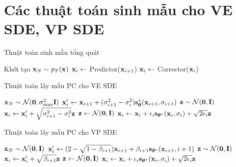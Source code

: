 \documentclass[10pt]{beamer}
\theoremstyle{remark}
\numberwithin{algocf}{section}
\numberwithin{equation}{section}
\numberwithin{dl}{section}
\numberwithin{figure}{section}
\begin{document}
\section{Các thuật toán sinh mẫu cho VE SDE, VP SDE}

\begin{frame}{Thuật toán sinh mẫu tổng quát}
	\begin{algorithm}[H]
		\DontPrintSemicolon
		Khởi tạo $\bold{x}_N \sim p_T(\bold{x})$\;
		 {
			$\bold{x}_i \gets$ Predictor($\bold{x}_{i+1}$)\;
			 {
				$\bold{x}_i \gets$ Corrector($\bold{x}_i$)\;
			}
		}
		\;
		\caption{Bộ lấy mẫu dự đoán - hiệu chỉnh (PC)}
		\label{alg:1}
	\end{algorithm}
\end{frame}

\begin{frame}{Thuật toán lấy mẫu PC cho VE SDE}
	\begin{algorithm}[H]
		\DontPrintSemicolon
		$\bold{x}_N \sim \mathcal{N}(\bold{0}, \sigma_{\max}^2 \bold{I})$\;
		 {
			$\bold{x}_i^{\prime} \gets \bold{x}_{i+1} + (\sigma_{i+1}^2 - \sigma_i^2)\bold{s}_{\boldsymbol{\theta}}^{\ast}(\bold{x}_{i+1}, \sigma_{i+1})$\;
			$\bold{z} \sim \mathcal{N}(\bold{0}, \bold{I})$\;
			$\bold{x}_i \gets \bold{x}_i^{\prime} + \sqrt{\sigma_{i+1}^2 - \sigma_i^2} \bold{z}$\;
			 {
				$\bold{z} \gets \mathcal{N}(\bold{0}, \bold{I})$\;
				$\bold{x}_i \gets \bold{x}_i + \epsilon_i \bold{s}_{\boldsymbol{\theta}^{\ast}}(\bold{x}_i, \sigma_i) + \sqrt{2 \epsilon_i} \bold{z}$\;
			}
		}
		\;
		\caption{Lấy mẫu PC (VE SDE)}
		\label{alg:2}
	\end{algorithm}
\end{frame}

\begin{frame}{Thuật toán lấy mẫu PC cho VP SDE}
	\begin{algorithm}[H]
		\DontPrintSemicolon
		$\bold{x}_N \sim \mathcal{N}(\bold{0}, \bold{I})$\;
		 {
			$\bold{x}_i^{\prime} \gets (2 - \sqrt{1 - \beta_{i+1}}) \bold{x}_{i+1} + \beta_{i+1} \bold{s}_{\boldsymbol{\theta}^{\ast}}(\bold{x}_{i+1}, i+1)$\;
			$\bold{z} \sim \mathcal{N}(\bold{0}, \bold{I})$\;
			$\bold{x}_i \gets \bold{x}_i^{\prime} + \sqrt{\beta_{i+1}} \bold{z}$\;
			 {
				$\bold{z} \gets \mathcal{N}(\bold{0}, \bold{I})$\;
				$\bold{x}_i \gets \bold{x}_i + \epsilon_i \bold{s}_{\boldsymbol{\theta}^{\ast}}(\bold{x}_i, \sigma_i) + \sqrt{2 \epsilon_i} \bold{z}$\;
			}
		}
		\;
		\caption{Lấy mẫu PC (VP SDE)}
		\label{alg:3}
	\end{algorithm}
\end{frame}
\end{document}
